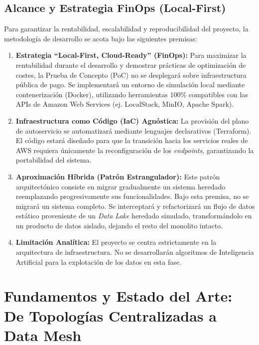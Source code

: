 \documentclass[12pt, a4paper]{article}
\begin{document}
\subsection{Alcance y Estrategia FinOps (Local-First)}

Para garantizar la rentabilidad, escalabilidad y reproducibilidad del proyecto, la metodología de desarrollo se acota bajo las siguientes premisas:

\begin{enumerate}
    \item \textbf{Estrategia ``Local-First, Cloud-Ready'' (FinOps):} Para maximizar la rentabilidad durante el desarrollo y demostrar prácticas de optimización de costes, la Prueba de Concepto (PoC) no se desplegará sobre infraestructura pública de pago. Se implementará un entorno de simulación local mediante contenerización (Docker), utilizando herramientas 100\% compatibles con las APIs de Amazon Web Services (ej. LocalStack, MinIO, Apache Spark).
    \item \textbf{Infraestructura como Código (IaC) Agnóstica:} La provisión del plano de autoservicio se automatizará mediante lenguajes declarativos (Terraform). El código estará diseñado para que la transición hacia los servicios reales de AWS requiera únicamente la reconfiguración de los \textit{endpoints}, garantizando la portabilidad del sistema.
    \item \textbf{Aproximación Híbrida (Patrón Estrangulador):} Este patrón arquitectónico consiste en migrar gradualmente un sistema heredado reemplazando progresivamente sus funcionalidades. Bajo esta premisa, no se migrará un sistema completo. Se interceptará y refactorizará un flujo de datos estático proveniente de un \textit{Data Lake} heredado simulado, transformándolo en un producto de datos aislado, dejando el resto del monolito intacto.
    \item \textbf{Limitación Analítica:} El proyecto se centra estrictamente en la arquitectura de infraestructura. No se desarrollarán algoritmos de Inteligencia Artificial para la explotación de los datos en esta fase.
\end{enumerate}

\section{Fundamentos y Estado del Arte: De Topologías Centralizadas a Data Mesh}
\end{document}
